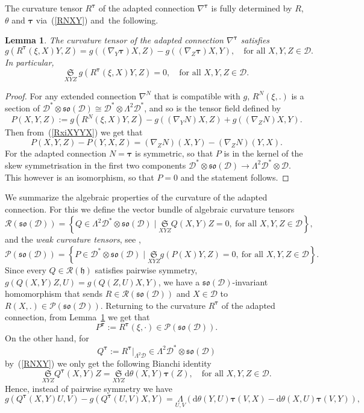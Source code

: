\documentclass{amsart}
\theoremstyle{plain}
\newtheorem{lem}[theorem]{Lemma}
\theoremstyle{definition}
\def\R{\mathcal{R}}
\def\P{\mathcal{P}}
\def\so{\mathfrak{so}}
\newcommand{\h}{\mathfrak{h}}
\newcommand{\bt}{{\boldsymbol{\tau}}}
\newcommand{\Su}{\mathfrak{S}}
\newcommand{\1}{\mathbf{1}}
\newcommand{\D}{{\mathcal D}}
\renewcommand{\d}{\mathrm{d}}
\newcommand{\+}{\oplus}
\newcommand{\N}{N}
\begin{document}
The curvature tensor $R^\bt$ of the adapted connection $\nabla^\bt$  is fully determined by $R$, $\theta$ and $\bt$ via~(\ref{RNXY}) and~the following.
\begin{lem}\label{lemRAxi} The curvature tensor of the adapted connection $\nabla^\bt$  satisfies
	$$g(R^\bt(\xi,X)Y,Z)=g((\nabla_Y\bt)X,Z)-g((\nabla_Z\bt)X,Y),\quad\text{for all } X,Y,Z\in\D.$$
	In particular,
	\begin{equation}\label{BianchiRxi}
\underset{X Y Z}{\Su} \ g(R^\bt(\xi ,X)Y,Z)=0,  \quad\text{for all } X,Y,Z\in\D.
\end{equation} 
	
\end{lem}

\begin{proof}
For any extended connection $\nabla^\N$ that is compatible with $g$, $R^\N(\xi,.)$ is a section of  $\D^*\otimes \so(\D)\cong \D^*\otimes \Lambda^2\D^*$, 
and so is the tensor field defined by
	$$P(X,Y,Z):=g(R^\N(\xi,X)Y,Z)-g((\nabla_Y\N)X,Z)+g((\nabla_Z\N)X,Y).$$
	Then from~(\ref{RxiXYYX}) we get that
	\[P(X,Y,Z)-P(Y,X,Z)=(\nabla_Z\N)(X,Y)- (\nabla_Z\N)(Y,X).\]
For the adapted connection $\N=\bt$ is symmetric, so that 
	 $P$ is in the kernel 
of the skew symmetrisation in the first two components
$ \D^*\otimes \so(\D) \to \Lambda^2\D^*\otimes \D$. This  however  is an isomorphism, so that  $P=0$ and the statement follows.
 \end{proof}
 We summarize  the algebraic properties of the curvature of the adapted connection. For this we define the  vector  bundle of algebraic curvature tensors
 \[
 \R(\so(\D))=
 \left\{Q\in \Lambda^2\D^*\otimes \so(\D)\mid 
\underset{X Y Z}{\Su}Q(X,Y)Z  =0,\   \text{for all } X,Y,Z\in\D\right\},\]
and the {\em weak curvature tensors}, see \cite{Leistner},
\[
 \P(\so(\D))=
 \left\{P\in \D^*\otimes \so(\D)\mid 
\underset{X Y Z}{\Su}g( P(X)Y,Z)  =0,\   \text{for all } X,Y,Z\in\D\right\}.\]
Since every $Q\in \R(\h)$ satisfies pairwise symmetry, $g( Q(X,Y)Z,U)=g( Q(Z,U)X,Y)$, we have a $\so(\D)$-invariant homomorphism that sends 
 $R\in\R(\so(\D))$ and  $X\in \D$ to  $R(X,.)\in \P(\so(\D))$. 
Returning to the curvature $R^\bt$ of the adapted connection, from Lemma~\ref{lemRAxi} we get that
\[P^\bt:=R^\bt(\xi,\cdot)\in \P(\so(\D)).\] On the other hand, for 
\[Q^\bt:=R^\bt |_{\Lambda^2\D} \in \Lambda^2\D^*\otimes \so(\D)\]
by~(\ref{RNXY}) we only get the following Bianchi identity
\begin{equation}\label{BianchiTWnew}
\underset{X Y Z}{\Su} Q^\bt(X,Y)Z=\underset{X Y Z}{\Su} \d\theta(X,Y)\bt (Z),  \quad\text{for all } X,Y,Z\in\D.
\end{equation}
Hence, instead of pairwise symmetry we have
\begin{equation}
\label{pairwise}
g(Q^\bt(X,Y)U,V)-g(Q^\bt (U,V)X,Y) =
\underset{U,V}{\Lambda}\left( \d\theta(Y,U)\bt(V,X)- 
\d\theta(X,U)\bt(V,Y) 
\right),
\end{equation}
\end{document}
